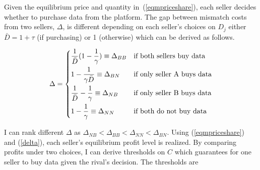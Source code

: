 \documentclass[12pt]{article}
\begin{document}
Given the equilibrium price and quantity in~(\ref{eqmpriceshare}), each seller decides whether to purchase data from the platform. The gap between mismatch costs from two sellers, $\Delta$, is different depending on each seller's choices on $D_j$ either $\bar{D}=1+\tau$ (if purchasing) or 1 (otherwise) which can be derived as follows. 
\begin{footnotesize}\begin{align}\label{delta}
	\begin{aligned}
	\Delta = \begin{dcases}
	\frac{1}{\bar{D}}(1-\frac{1}{\gamma}) \equiv \Delta_{BB}  & \text{if both sellers buy data}  \\
	1-\frac{1}{\gamma\bar{D}} \equiv \Delta_{BN}&  \text{if only seller A buys data} \\
	\frac{1}{\bar{D}}-\frac{1}{\gamma} \equiv \Delta_{NB}  &\text{if only seller B buys data}  \\
	1-\frac{1}{\gamma} \equiv \Delta_{NN}  &\text{if both do not buy data}  \\
	\end{dcases}\end{aligned}
	\end{align}\end{footnotesize}

I can rank different $\Delta$ as $\Delta_{NB}<\Delta_{BB}<\Delta_{NN}<\Delta_{BN}$. Using (\ref{eqmpriceshare}) and (\ref{delta}), each seller's equilibrium profit level is realized. By comparing profits under two choices, I can derive thresholds on $C$ which guarantees for one seller to buy data given the rival's decision. The thresholds are 

\end{document}
